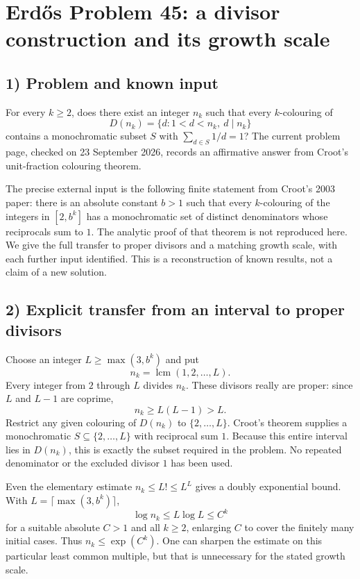 \section{Erd\H{o}s Problem 45: a divisor construction and its growth scale}

\subsection{1) Problem and known input}
For every $k\geq2$, does there exist an integer $n_k$ such that every
$k$-colouring of
\[
 D(n_k)=\{d:1<d<n_k,\ d\mid n_k\}
\]
contains a monochromatic subset $S$ with $\sum_{d\in S}1/d=1$?
The current problem page, checked on 23 September 2026, records an
affirmative answer from Croot's unit-fraction colouring theorem.

The precise external input is the following finite statement from
Croot's 2003 paper: there is an absolute constant $b>1$ such that
every $k$-colouring of the integers in $[2,b^k]$ has a monochromatic
set of distinct denominators whose reciprocals sum to $1$.
The analytic proof of that theorem is not reproduced here. We give
the full transfer to proper divisors and a matching growth scale,
with each further input identified. This is a reconstruction of known
results, not a claim of a new solution.

\subsection{2) Explicit transfer from an interval to proper divisors}
Choose an integer $L\geq\max(3,b^k)$ and put
\[
 n_k=\operatorname{lcm}(1,2,\ldots,L).
\]
Every integer from $2$ through $L$ divides $n_k$. These divisors really
are proper: since $L$ and $L-1$ are coprime,
\[
 n_k\geq L(L-1)>L.
\]
Restrict any given colouring of $D(n_k)$ to $\{2,\ldots,L\}$.
Croot's theorem supplies a monochromatic $S\subseteq\{2,\ldots,L\}$
with reciprocal sum $1$. Because this entire interval lies in
$D(n_k)$, this is exactly the subset required in the problem.
No repeated denominator or the excluded divisor $1$ has been used.

Even the elementary estimate $n_k\leq L!\leq L^L$ gives a doubly
exponential bound. With $L=\lceil\max(3,b^k)\rceil$,
\[
 \log n_k\leq L\log L\leq C^k
\]
for a suitable absolute $C>1$ and all $k\geq2$, enlarging $C$ to
cover the finitely many initial cases. Thus $n_k\leq\exp(C^k)$.
One can sharpen the estimate on this particular least common multiple,
but that is unnecessary for the stated growth scale.

